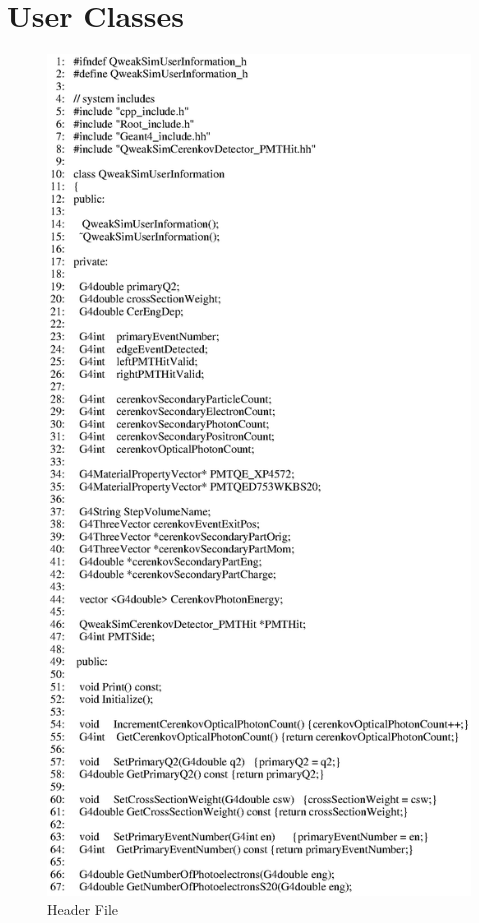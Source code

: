 \chapter{User Classes}\label{CHP_XVIII}

\clearpage

\begin{figure}[h]
  \hspace{0cm}
  \includegraphics[scale=0.8]{./figures18/QweakSimUserInformation.hh-p1.eps}
  \caption{\label{SourceXVIII1} Header File}
           \label{fig:XVIII-SC-1}
\end{figure}
\clearpage

